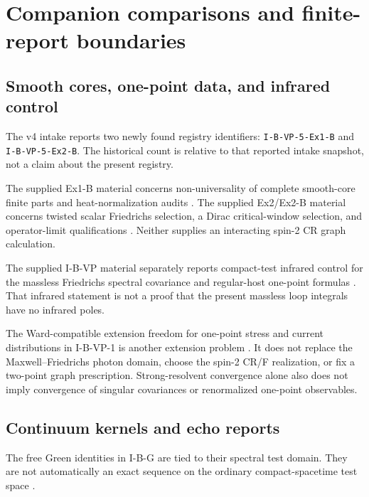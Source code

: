 \documentclass[11pt,a4paper]{article}
\newcommand{\loc}[1]{\nolinkurl{#1}}
\theoremstyle{plain}
\theoremstyle{definition}
\theoremstyle{remark}
\numberwithin{equation}{section}
\begin{document}
\section{Companion comparisons and finite-report boundaries}
\label{sec:comparisons}

\subsection{Smooth cores, one-point data, and infrared control}

The v4 intake reports two newly found registry identifiers:
\loc{I-B-VP-5-Ex1-B} and \loc{I-B-VP-5-Ex2-B}.
The historical count is relative to that reported intake snapshot,
not a claim about the present registry.

The supplied Ex1-B material concerns non-universality of complete
smooth-core finite parts and heat-normalization audits
\cite{CheungEx1B}. The supplied Ex2/Ex2-B material concerns
twisted scalar Friedrichs selection, a Dirac critical-window
selection, and operator-limit qualifications
\cite{CheungEx2,CheungEx2B}.
Neither supplies an interacting spin-2 CR graph calculation.

The supplied I-B-VP material separately reports compact-test
infrared control for the massless Friedrichs spectral covariance
and regular-host one-point formulas
\cite[{\loc{lem:infrared}, \loc{thm:friedrichs}}]{CheungVP}.
That infrared statement is not a proof that the present massless
loop integrals have no infrared poles.

The Ward-compatible extension freedom for one-point stress and
current distributions in I-B-VP-1 is another extension problem
\cite{CheungVP1}.
It does not replace the Maxwell--Friedrichs photon domain, choose
the spin-2 CR/F realization, or fix a two-point graph prescription.
Strong-resolvent convergence alone also does not imply convergence
of singular covariances or renormalized one-point observables.

\subsection{Continuum kernels and echo reports}

The free Green identities in I-B-G are tied to their spectral
test domain. They are not automatically an exact sequence on the
ordinary compact-spacetime test space
\cite[{\loc{thm:green}, \loc{rem:compact-exact}}]{CheungIBG}.
\end{document}
